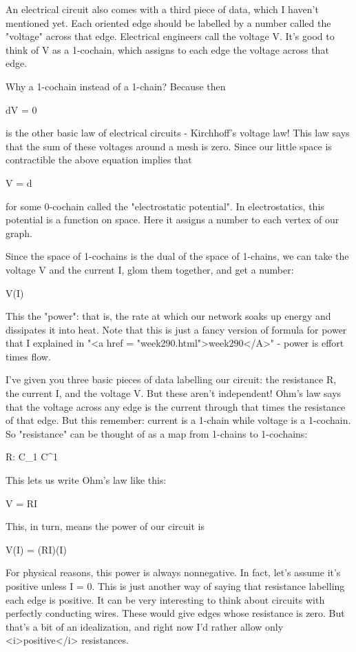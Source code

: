 An electrical circuit also comes with a third piece of data, which I
haven't mentioned yet.  Each oriented edge should be labelled by a
number called the "voltage" across that edge.  Electrical engineers
call the voltage V.  It's good to think of V as a 1-cochain, which
assigns to each edge the voltage across that edge.  

Why a 1-cochain instead of a 1-chain?  Because then

dV = 0

is the other basic law of electrical circuits - Kirchhoff's voltage
law!  This law says that the sum of these voltages around a mesh is
zero.  Since our little space is contractible the above equation
implies that

V = d\phi 

for some 0-cochain \phi  called the "electrostatic potential".  In 
electrostatics, this potential is a function on space.  Here it
assigns a number to each vertex of our graph.  

Since the space of 1-cochains is the dual of the space of 1-chains, we
can take the voltage V and the current I, glom them together, and get
a number:

V(I)

This the "power": that is, the rate at which our network
soaks up energy and dissipates it into heat.  Note that this is just a
fancy version of formula for power that I explained in "<a href =
"week290.html">week290</A>" - power is effort times flow.

I've given you three basic pieces of data labelling our circuit: the
resistance R, the current I, and the voltage V.  But these aren't
independent!  Ohm's law says that the voltage across any edge is the
current through that times the resistance of that edge.  But this
remember: current is a 1-chain while voltage is a 1-cochain.  So
"resistance" can be thought of as a map from 1-chains to
1-cochains:

R: C_{1} \to  C^{1}

This lets us write Ohm's law like this:

V = RI

This, in turn, means the power of our circuit is

V(I) = (RI)(I)

For physical reasons, this power is always nonnegative.  In fact,
let's assume it's positive unless I = 0.  This is just another way of
saying that resistance labelling each edge is positive.  It can be
very interesting to think about circuits with perfectly conducting
wires.  These would give edges whose resistance is zero.  But that's a
bit of an idealization, and right now I'd rather allow only <i>positive</i>
resistances.

